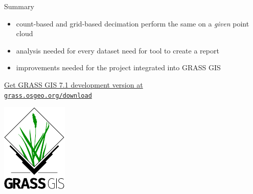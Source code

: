 \documentclass[xcolor={dvipsnames,usenames},beamer,aspectratio=1610]{beamer}
\begin{document}


\begin{frame}{}

\vspace*{0.05\textheight}

\begin{block}{Summary}
 \begin{itemize}
  \item count-based and grid-based decimation perform the same on a \emph{given} point cloud
  \item analysis needed for every dataset \textrightarrow{} need for tool to create a report
  \item improvements needed for the project integrated into GRASS GIS
 \end{itemize}
\end{block}

\bigskip

\centering
\href{https://grass.osgeo.org/download/}{%
Get GRASS GIS 7.1 development version at\\
\texttt{grass.osgeo.org/download}%
}

\smallskip

\includegraphics[height=0.25\textheight]{logos/grass_gis}


\end{frame}
\end{document}
